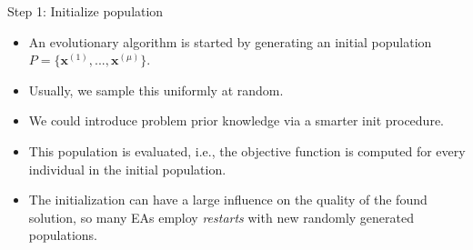 \documentclass[11pt,compress,t,notes=noshow, xcolor=table]{beamer}
\begin{document}
\begin{vbframe}{Step 1: Initialize population}
    \begin{itemize}
            \item An evolutionary algorithm is started by generating an initial population $P = \{\bm{x}^{(1)}, ..., \bm{x}^{(\mu)}\}$.
            \item Usually, we sample this uniformly at random.
            \item We could introduce problem prior knowledge via a smarter init procedure.
            \item This population is evaluated, i.e., the objective function is computed for every individual in the initial population.
            \item The initialization can have a large influence on the quality of the found solution, so many EAs employ \textit{restarts} with new randomly generated populations.
    \end{itemize}

\end{vbframe}
\end{document}
